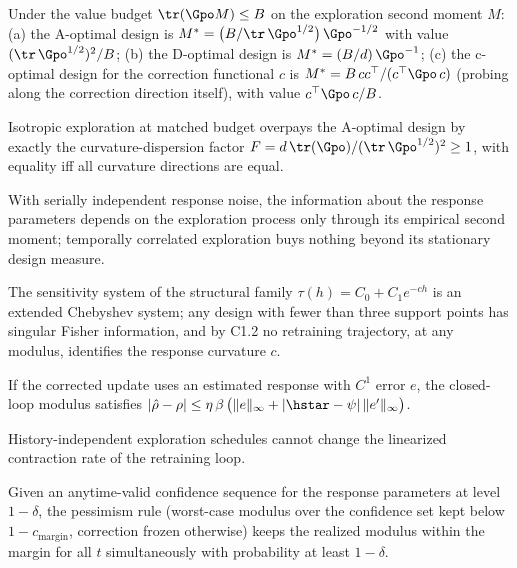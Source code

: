 \begin{theorem}
Under the value budget $\tr(\Gpo M) \le B$ on the exploration second
moment $M$:
(a) the A-optimal design is $M^{*} = \big(B/\tr\,\Gpo^{1/2}\big)\,
\Gpo^{-1/2}$ with value $(\tr\,\Gpo^{1/2})^2/B$;
(b) the D-optimal design is $M^{*} = (B/d)\,\Gpo^{-1}$;
(c) the c-optimal design for the correction functional $c$ is
$M^{*} = B\,cc^\top/(c^\top \Gpo\, c)$ (probing along the correction
direction itself), with value $c^\top \Gpo\, c / B$.
\end{theorem}

\begin{corollary}
Isotropic exploration at matched budget overpays the A-optimal design by
exactly the curvature-dispersion factor
$F = d\,\tr(\Gpo)/(\tr\,\Gpo^{1/2})^2 \ge 1$, with equality iff all
curvature directions are equal.
\end{corollary}

\begin{lemma}
With serially independent response noise, the information about the
response parameters depends on the exploration process only through its
empirical second moment; temporally correlated exploration buys nothing
beyond its stationary design measure.
\end{lemma}

\begin{theorem}
The sensitivity system of the structural family
$\tau(h) = C_0 + C_1 e^{-ch}$ is an extended Chebyshev system; any design
with fewer than three support points has singular Fisher information, and
by C1.2 no retraining trajectory, at any modulus, identifies the response
curvature $c$.
\end{theorem}

\begin{lemma}
If the corrected update uses an estimated response with $C^1$ error $e$,
the closed-loop modulus satisfies
$|\hat\rho - \rho| \le \eta\,\beta\,\big(\|e\|_\infty +
|\hstar-\psi|\,\|e'\|_\infty\big)$.
\end{lemma}

\begin{remark}
History-independent exploration schedules cannot change the linearized
contraction rate of the retraining loop.
\end{remark}

\begin{proposition}
Given an anytime-valid confidence sequence for the response parameters at
level $1-\delta$, the pessimism rule (worst-case modulus over the
confidence set kept below $1 - c_{\mathrm{margin}}$, correction frozen
otherwise) keeps the realized modulus within the margin for all $t$
simultaneously with probability at least $1-\delta$.
\end{proposition}


